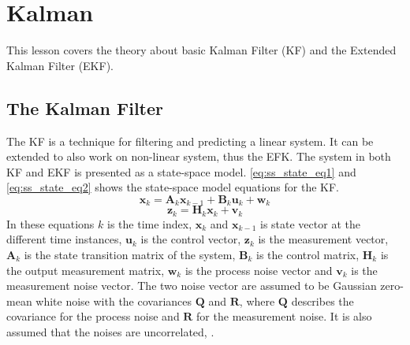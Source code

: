 \documentclass[Main]{subfiles}
\begin{document}
\section{Kalman} %
	\label{sec:kalman}
This lesson covers the theory about basic Kalman Filter (KF) and the Extended Kalman Filter (EKF).
\subsection{The Kalman Filter}
The KF is a technique for filtering and predicting a linear system. 
It can be extended to also work on non-linear system, thus the EFK. 
The system in both KF and EKF is presented as a state-space model.
\autoref{eq:ss_state_eq1} and \autoref{eq:ss_state_eq2} shows the state-space model equations for the KF.
\begin{equation}
\label{eq:ss_state_eq1}
\mathbf{x}_k = \mathbf{A}_k \mathbf{x}_{k-1} + \mathbf{B}_k \mathbf{u}_k + \mathbf{w}_k
\end{equation}
\begin{equation}
\label{eq:ss_state_eq2}
\mathbf{z}_k = \mathbf{H}_k \mathbf{x}_k + \mathbf{v}_k
\end{equation}
In these equations $k$ is the time index, $\mathbf{x}_k$ and $\mathbf{x}_{k-1}$ is state vector at the different time instances, $\mathbf{u}_k$ is the control vector, $\mathbf{z}_k$ is the measurement vector, $\mathbf{A}_k$ is the state transition matrix of the system, $\mathbf{B}_k$ is the control matrix, $\mathbf{H}_k$ is the output measurement matrix, $\mathbf{w}_k$ is the process noise vector and $\mathbf{v}_k$ is the measurement noise vector.
The two noise vector are assumed to be Gaussian zero-mean white noise with the covariances $\mathbf{Q}$ and $\mathbf{R}$, where $\mathbf{Q}$ describes the covariance for the process noise and $\mathbf{R}$ for the measurement noise. 
It is also assumed that the noises are uncorrelated, \citep{Simon2006}.
\end{document}
